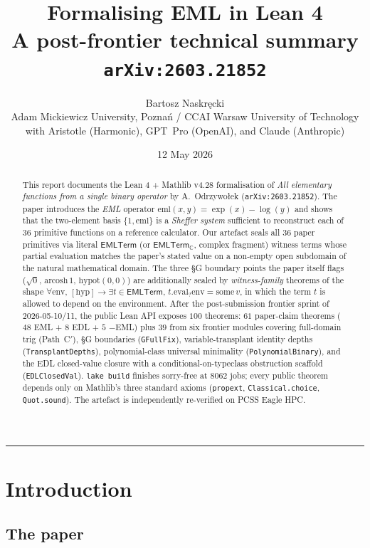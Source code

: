 \documentclass[11pt,a4paper]{article}
\title{\Large\textbf{Formalising EML in Lean 4}\\[2pt]
       \large A post-frontier technical summary\\
       \texttt{arXiv:2603.21852}}
\author{Bartosz Naskręcki\\
        \small Adam Mickiewicz University, Pozna\'n /
        CCAI Warsaw University of Technology\\[1pt]
        \small with Aristotle (Harmonic), GPT~Pro (OpenAI),
        and Claude (Anthropic)}
\date{12 May 2026}
\theoremstyle{plain}
\theoremstyle{definition}
\newcommand{\C}{\mathbb{C}}
\newcommand{\eml}{\mathrm{eml}}
\newcommand{\EMLT}{\mathsf{EMLTerm}}
\newcommand{\EMLTC}{\mathsf{EMLTerm}_\C}
\begin{document}
\maketitle

\begin{abstract}
This report documents the Lean 4 + Mathlib v4.28 formalisation of
\emph{All elementary functions from a single binary operator} by
A.~Odrzywo\l{}ek (\texttt{arXiv:2603.21852}). The paper introduces the
\emph{EML} operator $\eml(x,y) = \exp(x) - \log(y)$ and shows that the
two-element basis $\{1, \eml\}$ is a \emph{Sheffer system} sufficient
to reconstruct each of $36$ primitive functions on a reference
calculator. Our artefact seals all $36$ paper primitives via literal
$\EMLT$ (or $\EMLTC$, complex fragment) witness terms whose partial
evaluation matches the paper's stated value on a non-empty open
subdomain of the natural mathematical domain. The three §G boundary
points the paper itself flags ($\sqrt{0}$, $\mathrm{arcosh}\,1$,
$\mathrm{hypot}(0,0)$) are additionally sealed by \emph{witness-family}
theorems of the shape $\forall \mathrm{env},\,[\mathrm{hyp}] \to
\exists t \in \EMLT,\,t.\mathrm{eval}_? \mathrm{env} =
\mathrm{some}\,v$, in which the term $t$ is allowed to depend on the
environment. After the post-submission frontier sprint of
2026-05-10/11, the public Lean API exposes $100$ theorems:
$61$ paper-claim theorems ($48$ EML + $8$ EDL + $5$ $-$EML) plus
$39$ from six frontier modules covering full-domain trig (Path~C$'$),
§G boundaries (\texttt{GFullFix}), variable-transplant identity depths
(\texttt{TransplantDepths}), polynomial-class universal minimality
(\texttt{PolynomialBinary}), and the EDL closed-value closure with a
conditional-on-typeclass obstruction scaffold (\texttt{EDLClosedVal}).
\texttt{lake build} finishes sorry-free at $8062$ jobs; every public
theorem depends only on Mathlib's three standard axioms
(\texttt{propext}, \texttt{Classical.choice}, \texttt{Quot.sound}).
The artefact is independently re-verified on PCSS Eagle HPC.
\end{abstract}

\tableofcontents
\bigskip\hrule\bigskip

\section{Introduction}\label{sec:intro}

\subsection{The paper}
\end{document}
